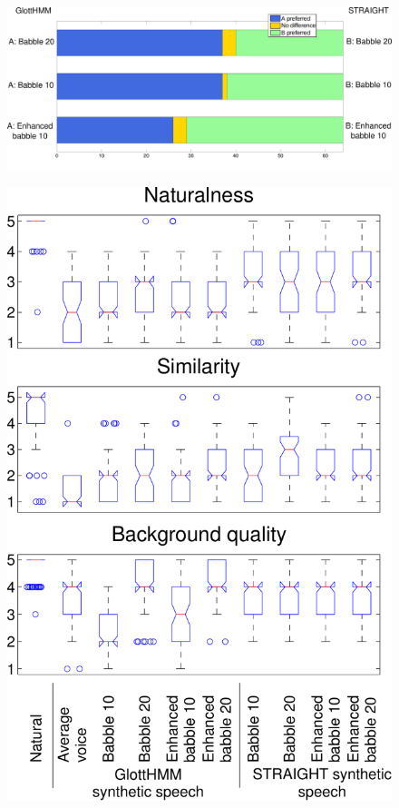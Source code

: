 \begin{figure}[!htb]
  \begin{centering}
  \includegraphics[width=\textwidth]{images/glott_vs_st.pdf}
  \caption{}
  \label{fig:glott_vs_st}
  \end{centering}
\end{figure}

\begin{figure}[!htb]
  \begin{centering}
  \includegraphics[width=\textwidth]{images/all_subjective_test_quality.pdf}
  \caption{}
  \label{fig:mos_scores}
  \end{centering}
\end{figure}